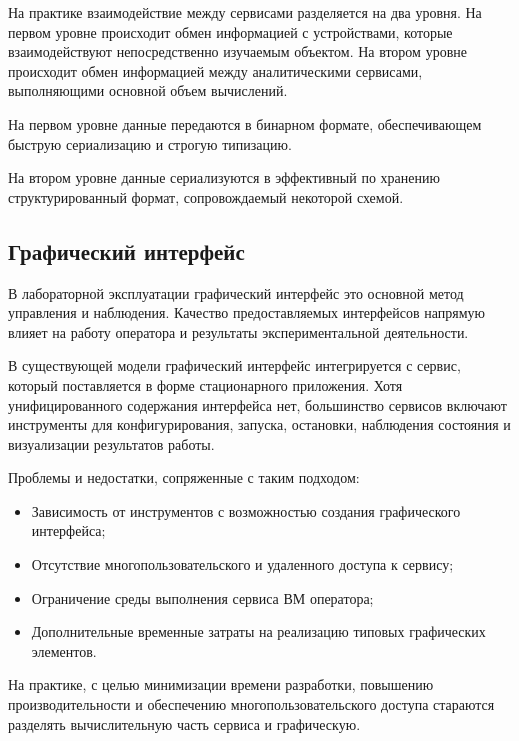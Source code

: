 \documentclass[../thesis.tex]{subfiles}
\begin{document}
	На практике взаимодействие между сервисами разделяется на два уровня. На первом уровне происходит
	обмен информацией с устройствами, которые взаимодействуют непосредственно изучаемым объектом. На втором
	уровне происходит обмен информацией между аналитическими сервисами, выполняющими основной объем
	вычислений.

	На первом уровне данные передаются в бинарном формате, обеспечивающем быструю сериализацию и строгую
	типизацию.

	На втором уровне данные сериализуются в эффективный по хранению
	\linebreak
	структурированный формат, сопровождаемый некоторой схемой.

	\subsection{Графический интерфейс}

	В лабораторной эксплуатации графический интерфейс это основной метод управления и наблюдения.
	Качество предоставляемых интерфейсов напрямую влияет на работу оператора и результаты
	экспериментальной деятельности.

	В существующей модели графический интерфейс интегрируется с сервис, который поставляется в форме стационарного
	приложения. Хотя унифицированного содержания интерфейса нет, большинство сервисов включают инструменты
	для конфигурирования, запуска, остановки, наблюдения состояния и визуализации результатов работы.

	Проблемы и недостатки, сопряженные с таким подходом:

	\begin{itemize}
		\item Зависимость от инструментов с возможностью создания графического интерфейса;

		\item Отсутствие многопользовательского и удаленного доступа к сервису;

		\item Ограничение среды выполнения сервиса ВМ оператора;

		\item Дополнительные временные затраты на реализацию типовых графических элементов.
	\end{itemize}

	На практике, с целью минимизации времени разработки, повышению производительности и обеспечению
	многопользовательского доступа стараются
	\linebreak
	разделять вычислительную часть сервиса и графическую.
\end{document}
